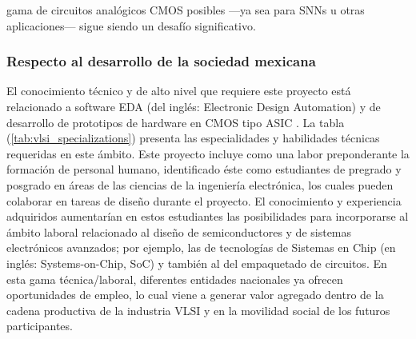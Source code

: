 \documentclass[letter, 12pt]{article}
\begin{document}
gama de circuitos analógicos CMOS posibles —ya sea para SNNs u otras aplicaciones— sigue siendo un desafío significativo.



\subsubsection{Respecto al desarrollo de la sociedad mexicana}


El conocimiento técnico y de alto nivel que requiere este proyecto está relacionado a software EDA (del inglés: Electronic Design Automation) y de desarrollo de prototipos de hardware en CMOS tipo ASIC \cite{weste2011cmos}. La tabla (\ref{tab:vlsi_specializations}) presenta las especialidades y habilidades técnicas requeridas en este ámbito.
Este proyecto incluye como una labor preponderante la formación de personal humano, identificado éste como estudiantes de pregrado y posgrado en áreas de las ciencias de la ingeniería electrónica, los cuales pueden colaborar en tareas de diseño durante el proyecto. El conocimiento y experiencia adquiridos aumentarían en estos estudiantes las posibilidades para incorporarse al ámbito laboral relacionado al diseño de semiconductores y de sistemas electrónicos avanzados; por ejemplo, las de tecnologías de Sistemas en Chip (en inglés: Systems-on-Chip, SoC) y también al del empaquetado de circuitos. En esta gama técnica/laboral, diferentes entidades nacionales ya ofrecen oportunidades de empleo, lo cual viene a generar valor agregado dentro de la cadena productiva de la industria VLSI \cite{Valdes_2024} y en la movilidad social de los futuros participantes. 
\end{document}
